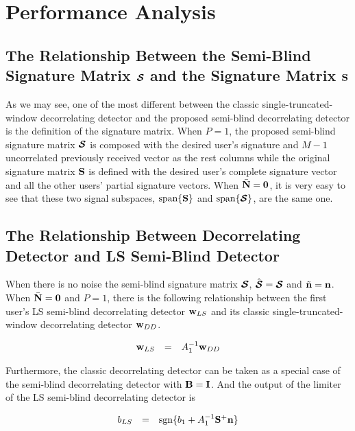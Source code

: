 \documentclass[a4paper,11pt,fleqn]{article}
\newcommand{\bn}{{\bf n}}
\newcommand{\bw}{{\bf w}}
\newcommand{\bN}{{\bf N}}
\newcommand{\bS}{{\bf S}}
\newcommand{\bI}{{\bf I}}
\newcommand{\bB}{{\bf B}}
\newcommand{\bcS}{{\mbox {\boldmath ${\cal S}$}}}
\begin{document}
\section{Performance Analysis}

\subsection{The Relationship Between the Semi-Blind Signature Matrix $\bcS$ and the Signature Matrix $\bS$}

As we may see, one of the most different between the classic
single-truncated-window decorrelating detector and the proposed
semi-blind decorrelating detector is the definition of the
signature matrix. When $P=1$, the proposed semi-blind signature
matrix $\bcS$ is composed with the desired user's signature and
$M-1$ uncorrelated previously received vector as the rest columns
while the original signature matrix $\bS$ is defined with the
desired user's complete signature vector and all the other users'
partial signature vectors. When $\bar{\bN} = \mathbf{0}$, it is
very easy to see that these two signal subspaces,
$\mbox{span}\{\bS\}$ and $\mbox{span}\{\bcS\}$, are the same one.

\subsection{The Relationship Between Decorrelating Detector and LS Semi-Blind Detector }

When there is no noise the semi-blind signature matrix $\bcS$,
$\hat{\bcS}=\bcS$ and $\tilde{\bn}=\bn$. When
$\bar{\bN}=\mathbf{0}$ and $P=1$, there is the following
relationship between the first user's LS semi-blind decorrelating
detector $\bw_{LS}$ and its classic single-truncated-window
decorrelating detector $\bw_{DD}$.

\begin{equation}
\begin{array}{rcl}
\bw_{LS}&=&A_1^{-1}\bw_{DD}
\end{array}
\end{equation} \label{wN0}

\noindent Furthermore, the classic decorrelating detector can be
taken as a special case of the semi-blind decorrelating detector
with $\bB =\bI$. And the output of the limiter of the LS
semi-blind decorrelating detector is

\begin{equation}
\begin{array}{rcl}
b_{LS}&=&\mbox{sgn}\{b_1+A_1^{-1}\bS^+\bn\}
\end{array} \label{b_LS_N0}
\end{equation}
\end{document}
